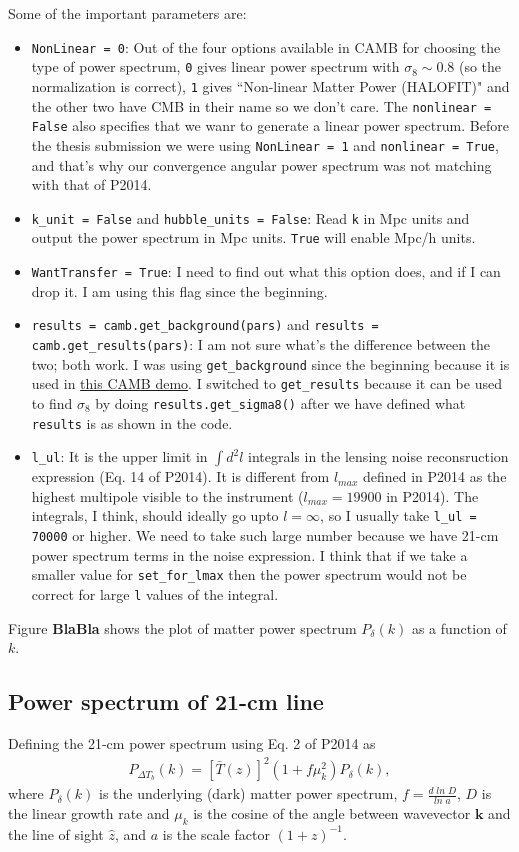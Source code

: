 \documentclass[12pt,a4paper]{article}
\begin{document}
Some of the important parameters are:
\begin{itemize}
	\item \verb|NonLinear = 0|: Out of the four options available in CAMB for choosing the type of power spectrum, \verb|0| gives linear power spectrum with $ \sigma_8 \sim 0.8$ (so the normalization is correct), \verb|1| gives ``Non-linear Matter Power (HALOFIT)" and the other two have CMB in their name so we don't care. The \verb|nonlinear = False| also specifies that we wanr to generate a linear power spectrum. Before the thesis submission we were using \verb|NonLinear = 1| and \verb|nonlinear = True|, and that's why our convergence angular power spectrum was not matching with that of P2014. 
	\item \verb|k_unit = False| and \verb|hubble_units = False|: Read \verb|k| in Mpc units and output the power spectrum in Mpc units. \verb|True| will enable Mpc/h units.
	\item \verb|WantTransfer = True|: I need to find out what this option does, and if I can drop it. I am using this flag since the beginning.
	\item \verb|results = camb.get_background(pars)| and \verb|results = camb.get_results(pars)|: I am not sure what's the difference between the two; both work. I was using \verb|get_background| since the beginning because it is used in \href{https://camb.readthedocs.io/en/latest/CAMBdemo.html}{this CAMB demo}. I switched to \verb|get_results| because it can be used to find $\sigma_8$ by doing \verb|results.get_sigma8()| after we have defined what \verb|results| is as shown in the code.
	\item \verb|l_ul|: It is the upper limit in $ \int d^2l $ integrals in the lensing noise reconsruction expression (Eq. 14 of P2014). It is different from $ l_{max} $ defined in P2014 as the highest multipole visible to the instrument ($ l_{max}  = 19900 $ in P2014). The integrals, I think, should ideally go upto $ l = \infty $, so I usually take \verb|l_ul = 70000| or higher. We need to take such large number because we have 21-cm power spectrum terms in the noise expression. I think that if we take a smaller value for \verb|set_for_lmax| then the power spectrum would not be correct for large \verb|l| values of the integral.
\end{itemize}
Figure \textbf{BlaBla} shows the plot of matter power spectrum $ P_\delta(k) $ as a function of $ k $.


\subsection{Power spectrum of 21-cm line}
Defining the 21-cm power spectrum using Eq. 2 of P2014 as 
\begin{align}
P_{\Delta T_b}(k) = [\bar{T}(z)]^2 (1 + f\mu_k^2)P_\delta(k),
\end{align}
where $ P_\delta(k) $ is the underlying (dark) matter power spectrum, $ f = \frac{d\;ln\; D}{ln\;a}$, $ D $ is the linear growth rate and $ \mu_k$ is the cosine of the angle between wavevector $ \textbf{k} $ and the line of sight $ \hat{z} $, and $ a $ is the scale factor $ (1 + z)^{-1} $.
\end{document}
